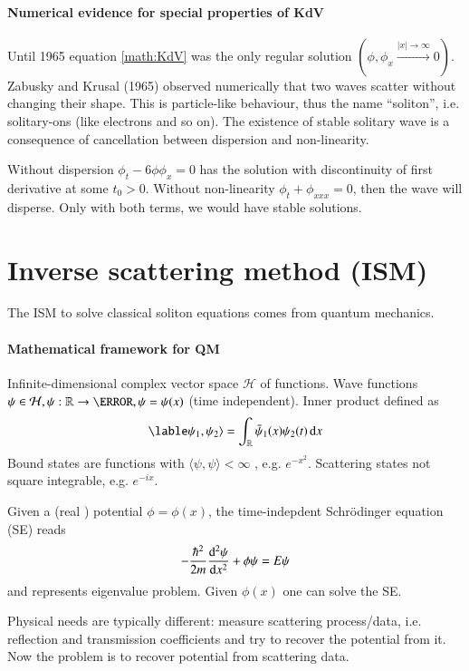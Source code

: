 \paragraph{Numerical evidence for special properties of KdV}
Until 1965 equation \eqref{math:KdV} was the only regular solution $(\phi, \phi_x \stackrel{|x| \rightarrow \infty}{\rightarrow} 0)$. Zabusky and Krusal (1965) observed numerically that two waves scatter without changing their shape. This is particle-like behaviour, thus the name ``soliton'', i.e. solitary-ons (like electrons and so on). The existence of stable solitary wave is a consequence of cancellation between dispersion and non-linearity.

Without dispersion $\phi_t - 6 \phi \phi_x = 0$ has the solution with discontinuity of first derivative at some $t_0 > 0$. Without non-linearity $\phi_t + \phi_{x x x} = 0$, then the wave will disperse. Only with both terms, we would have stable solutions.

\section{Inverse scattering method (ISM)}
The ISM to solve classical soliton equations comes from quantum mechanics.

\paragraph{Mathematical framework for QM}
Infinite-dimensional complex vector space $\mathcal{H}$ of functions. Wave functions $\psi \in \mathcal{H}, \psi: \R \rightarrow \C, \psi = \psi(x)$ (time independent). Inner product defined as 
\begin{equation}
	\lable \psi_1, \psi_2 \rangle = \int_{\R} \bar{\psi}_1 (x) \psi_2(t) \dd{x}
\end{equation}
Bound states are functions with $\langle \psi, \psi \rangle < \infty$ , e.g. $e^{-x^2}$.  Scattering states not square integrable, e.g. $e^{-ix}$.

Given a (real ) potential $\phi = \phi(x)$, the time-indepdent Schrödinger equation (SE) reads 
\begin{equation*}
	- \frac{\hbar^2}{2m} \dv[2]{\psi}{x} + \phi \psi = E \psi
\end{equation*}
and represents eigenvalue problem. Given $\phi(x)$ one can solve the SE.

Physical needs are typically different: measure scattering process/data, i.e. reflection and transmission coefficients and try to recover the potential from it. Now the problem is to recover potential from scattering data.

